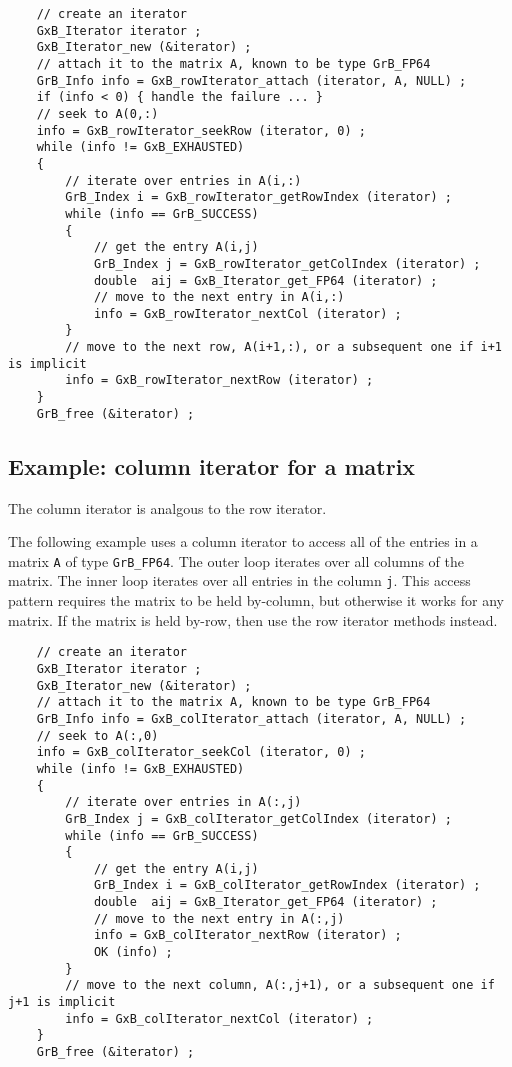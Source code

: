 \documentclass[12pt]{article}
\begin{document}
{    {\footnotesize
    \begin{verbatim}
    // create an iterator
    GxB_Iterator iterator ;
    GxB_Iterator_new (&iterator) ;
    // attach it to the matrix A, known to be type GrB_FP64
    GrB_Info info = GxB_rowIterator_attach (iterator, A, NULL) ;
    if (info < 0) { handle the failure ... }
    // seek to A(0,:)
    info = GxB_rowIterator_seekRow (iterator, 0) ;
    while (info != GxB_EXHAUSTED)
    {
        // iterate over entries in A(i,:)
        GrB_Index i = GxB_rowIterator_getRowIndex (iterator) ;
        while (info == GrB_SUCCESS)
        {
            // get the entry A(i,j)
            GrB_Index j = GxB_rowIterator_getColIndex (iterator) ;
            double  aij = GxB_Iterator_get_FP64 (iterator) ;
            // move to the next entry in A(i,:)
            info = GxB_rowIterator_nextCol (iterator) ;
        }
        // move to the next row, A(i+1,:), or a subsequent one if i+1 is implicit
        info = GxB_rowIterator_nextRow (iterator) ;
    }
    GrB_free (&iterator) ; \end{verbatim}}

\newpage
\subsection{Example: column iterator for a matrix}

The column iterator is analgous to the row iterator.

The following example uses a column iterator to access all of the entries in a
matrix \verb'A' of type \verb'GrB_FP64'.  The outer loop iterates over all
columns of the matrix.  The inner loop iterates over all entries in the column
\verb'j'.  This access pattern requires the matrix to be held by-column, but
otherwise it works for any matrix.  If the matrix is held by-row, then use
the row iterator methods instead.

    {\footnotesize
    \begin{verbatim}
    // create an iterator
    GxB_Iterator iterator ;
    GxB_Iterator_new (&iterator) ;
    // attach it to the matrix A, known to be type GrB_FP64
    GrB_Info info = GxB_colIterator_attach (iterator, A, NULL) ;
    // seek to A(:,0)
    info = GxB_colIterator_seekCol (iterator, 0) ;
    while (info != GxB_EXHAUSTED)
    {
        // iterate over entries in A(:,j)
        GrB_Index j = GxB_colIterator_getColIndex (iterator) ;
        while (info == GrB_SUCCESS)
        {
            // get the entry A(i,j)
            GrB_Index i = GxB_colIterator_getRowIndex (iterator) ;
            double  aij = GxB_Iterator_get_FP64 (iterator) ;
            // move to the next entry in A(:,j)
            info = GxB_colIterator_nextRow (iterator) ;
            OK (info) ;
        }
        // move to the next column, A(:,j+1), or a subsequent one if j+1 is implicit
        info = GxB_colIterator_nextCol (iterator) ;
    }
    GrB_free (&iterator) ; \end{verbatim}}

}
\end{document}
